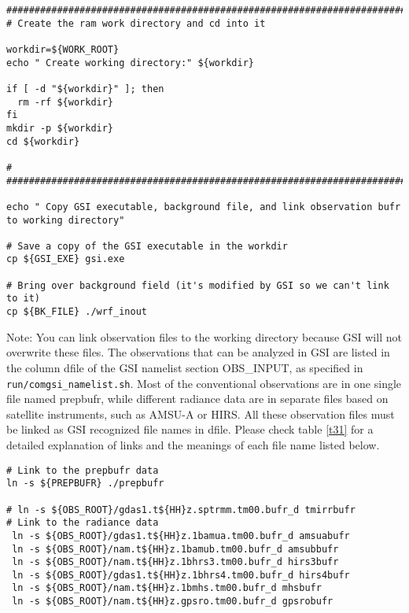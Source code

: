 \begin{scriptsize}
\begin{verbatim} 
##################################################################################
# Create the ram work directory and cd into it

workdir=${WORK_ROOT}
echo " Create working directory:" ${workdir}

if [ -d "${workdir}" ]; then
  rm -rf ${workdir}
fi
mkdir -p ${workdir}
cd ${workdir}

#
##################################################################################

echo " Copy GSI executable, background file, and link observation bufr to working directory"

# Save a copy of the GSI executable in the workdir
cp ${GSI_EXE} gsi.exe

# Bring over background field (it's modified by GSI so we can't link to it)
cp ${BK_FILE} ./wrf_inout
\end{verbatim}
\end{scriptsize}

Note: You can link observation files to the working directory because GSI will not overwrite these files. The observations that can be analyzed in GSI are listed in the column dfile of the GSI namelist section OBS\_INPUT, as specified in \verb|run/comgsi_namelist.sh|. Most of the conventional observations are in one single file named prepbufr, while different radiance data are in separate files based on satellite instruments, such as AMSU-A or HIRS. All these observation files must be linked as GSI recognized file names in dfile. Please check table \ref{t31} for a detailed explanation of links and the meanings of each file name listed below.

\begin{footnotesize}
\begin{verbatim}
# Link to the prepbufr data
ln -s ${PREPBUFR} ./prepbufr

# ln -s ${OBS_ROOT}/gdas1.t${HH}z.sptrmm.tm00.bufr_d tmirrbufr
# Link to the radiance data
 ln -s ${OBS_ROOT}/gdas1.t${HH}z.1bamua.tm00.bufr_d amsuabufr
 ln -s ${OBS_ROOT}/nam.t${HH}z.1bamub.tm00.bufr_d amsubbufr
 ln -s ${OBS_ROOT}/nam.t${HH}z.1bhrs3.tm00.bufr_d hirs3bufr
 ln -s ${OBS_ROOT}/gdas1.t${HH}z.1bhrs4.tm00.bufr_d hirs4bufr
 ln -s ${OBS_ROOT}/nam.t${HH}z.1bmhs.tm00.bufr_d mhsbufr
 ln -s ${OBS_ROOT}/nam.t${HH}z.gpsro.tm00.bufr_d gpsrobufr
\end{verbatim}
\end{footnotesize}

